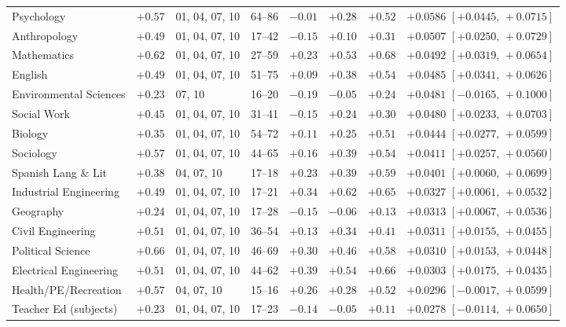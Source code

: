 \documentclass[11pt]{article}
\begin{document}
{\begin{longtable}{@{}>{\raggedright\arraybackslash}p{4.0cm}clccccl@{}}
Psychology & ${+}0.57$ & 01, 04, 07, 10 & 64--86 & ${-}0.01$ & ${+}0.28$ & ${+}0.52$ & ${+}0.0586$ $[{+}0.0445,\,{+}0.0715]$ \\
Anthropology & ${+}0.49$ & 01, 04, 07, 10 & 17--42 & ${-}0.15$ & ${+}0.10$ & ${+}0.31$ & ${+}0.0507$ $[{+}0.0250,\,{+}0.0729]$ \\
Mathematics & ${+}0.62$ & 01, 04, 07, 10 & 27--59 & ${+}0.23$ & ${+}0.53$ & ${+}0.68$ & ${+}0.0492$ $[{+}0.0319,\,{+}0.0654]$ \\
English & ${+}0.49$ & 01, 04, 07, 10 & 51--75 & ${+}0.09$ & ${+}0.38$ & ${+}0.54$ & ${+}0.0485$ $[{+}0.0341,\,{+}0.0626]$ \\
Environmental Sciences & ${+}0.23$ & 07, 10 & 16--20 & ${-}0.19$ & ${-}0.05$ & ${+}0.24$ & ${+}0.0481$ $[{-}0.0165,\,{+}0.1000]$ \\
Social Work & ${+}0.45$ & 01, 04, 07, 10 & 31--41 & ${-}0.15$ & ${+}0.24$ & ${+}0.30$ & ${+}0.0480$ $[{+}0.0233,\,{+}0.0703]$ \\
Biology & ${+}0.35$ & 01, 04, 07, 10 & 54--72 & ${+}0.11$ & ${+}0.25$ & ${+}0.51$ & ${+}0.0444$ $[{+}0.0277,\,{+}0.0599]$ \\
Sociology & ${+}0.57$ & 01, 04, 07, 10 & 44--65 & ${+}0.16$ & ${+}0.39$ & ${+}0.54$ & ${+}0.0411$ $[{+}0.0257,\,{+}0.0560]$ \\
Spanish Lang \& Lit & ${+}0.38$ & 04, 07, 10 & 17--18 & ${+}0.23$ & ${+}0.39$ & ${+}0.59$ & ${+}0.0401$ $[{+}0.0060,\,{+}0.0699]$ \\
Industrial Engineering & ${+}0.49$ & 01, 04, 07, 10 & 17--21 & ${+}0.34$ & ${+}0.62$ & ${+}0.65$ & ${+}0.0327$ $[{+}0.0061,\,{+}0.0532]$ \\
Geography & ${+}0.24$ & 01, 04, 07, 10 & 17--28 & ${-}0.15$ & ${-}0.06$ & ${+}0.13$ & ${+}0.0313$ $[{+}0.0067,\,{+}0.0536]$ \\
Civil Engineering & ${+}0.51$ & 01, 04, 07, 10 & 36--54 & ${+}0.13$ & ${+}0.34$ & ${+}0.41$ & ${+}0.0311$ $[{+}0.0155,\,{+}0.0455]$ \\
Political Science & ${+}0.66$ & 01, 04, 07, 10 & 46--69 & ${+}0.30$ & ${+}0.46$ & ${+}0.58$ & ${+}0.0310$ $[{+}0.0153,\,{+}0.0448]$ \\
Electrical Engineering & ${+}0.51$ & 01, 04, 07, 10 & 44--62 & ${+}0.39$ & ${+}0.54$ & ${+}0.66$ & ${+}0.0303$ $[{+}0.0175,\,{+}0.0435]$ \\
Health/PE/Recreation & ${+}0.57$ & 04, 07, 10 & 15--16 & ${+}0.26$ & ${+}0.28$ & ${+}0.52$ & ${+}0.0296$ $[{-}0.0017,\,{+}0.0599]$ \\
Teacher Ed (subjects) & ${+}0.23$ & 01, 04, 07, 10 & 17--23 & ${-}0.14$ & ${-}0.05$ & ${+}0.11$ & ${+}0.0278$ $[{-}0.0114,\,{+}0.0650]$ \\

\end{longtable}}
\end{document}
